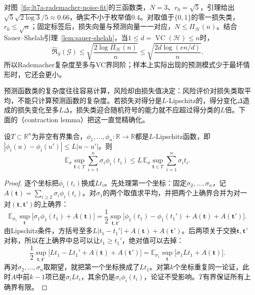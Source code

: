 对图~\ref{fig:lt7a-rademacher-noise-fit}的三函数类，$N=3$、$r_0=\sqrt5$，引理给出$\sqrt5\sqrt{2\log3}/5\approx0.66$，确实不小于枚举值$0.4$。对取值于$\{0,1\}$的零一损失类，$r_0\leq\sqrt n$；固定标签后，损失向量与预测向量一一对应，$N\leq\Pi_{\mathcal H}(n)$。结合Sauer--Shelah引理~\ref{lem:sauer-shelah}，当$1\leq d=\operatorname{VC}(\mathcal H)\leq n$时，
\begin{equation}
 \widehat{\mathfrak R}_S(\mathcal G)\leq\sqrt{\frac{2\log\Pi_{\mathcal H}(n)}{n}}\leq\sqrt{\frac{2d\log(en/d)}{n}}.
 \label{eq:rademacher-vc-comparison}
\end{equation}
所以Rademacher复杂度至多与VC界同阶；样本上实际出现的预测模式少于最坏情形时，它还会更小。

预测函数类的复杂度往往容易计算，风险却由损失值决定：风险评价对损失类取平均，不能只计算预测函数的复杂度。若损失对得分是$L$-Lipschitz的，得分变化$\Delta$造成的损失变化至多$L\Delta$，损失类迎合随机符号的能力就不应超过得分类的$L$倍。下面的（contraction lemma）把这一直觉精确化。

\begin{lemma}[收缩引理]
\label{lem:rademacher-contraction}
设$T\subset\mathbb R^n$为非空有界集合，$\phi_1,\ldots,\phi_n:\mathbb R\to\mathbb R$都是$L$-Lipschitz函数，即$|\phi_i(u)-\phi_i(u')|\leq L|u-u'|$。则
\[
 \mathbb E_\sigma\sup_{\bm t\in T}\sum_{i=1}^n\sigma_i\phi_i(t_i)
 \leq L\,\mathbb E_\sigma\sup_{\bm t\in T}\sum_{i=1}^n\sigma_it_i.
\]
\end{lemma}
\begin{proof}
逐个坐标把$\phi_i(t_i)$换成$Lt_i$。先处理第一个坐标：固定$\sigma_2,\ldots,\sigma_n$，记$A(\bm t)=\sum_{i\geq2}\sigma_i\phi_i(t_i)$。对$\sigma_1$的两个取值求平均，并把两个上确界合并为对一对$(\bm t,\bm t')$的上确界：
\[
 \mathbb E_{\sigma_1}\sup_{\bm t}\bigl[\sigma_1\phi_1(t_1)+A(\bm t)\bigr]
 =\frac12\sup_{\bm t,\bm t'}\bigl[\phi_1(t_1)-\phi_1(t_1')+A(\bm t)+A(\bm t')\bigr].
\]
由Lipschitz条件，方括号至多$L|t_1-t_1'|+A(\bm t)+A(\bm t')$。后两项关于交换$\bm t,\bm t'$对称，所以在上确界中总可以让$t_1\geq t_1'$，绝对值可以去掉：
\[
 \frac12\sup_{\bm t,\bm t'}\bigl[L t_1-Lt_1'+A(\bm t)+A(\bm t')\bigr]
 =\mathbb E_{\sigma_1}\sup_{\bm t}\bigl[\sigma_1Lt_1+A(\bm t)\bigr].
\]
再对$\sigma_2,\ldots,\sigma_n$取期望，就把第一个坐标换成了$Lt_1$。对第$k$个坐标重复同一论证，此时$A$中前$k-1$项已是$\sigma_iLt_i$，其余仍是$\sigma_i\phi_i(t_i)$，论证不受影响。$T$有界保证所有上确界有限。
\end{proof}

